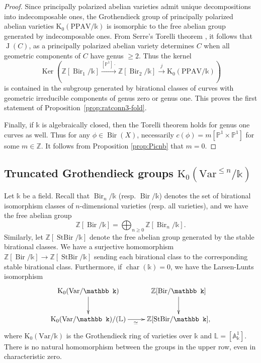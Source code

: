 \documentclass[a4paper,12pt]{amsart}
\def\A{\mathbb A}
\def\k{\mathbb k}
\def\L{\mathbb L}
\def\P{\mathbb P}
\def\Z{\mathbb Z}
\def\chr{{\operatorname{char}}}
\def\Ker{{\operatorname{Ker}}}
\def\chr{{\operatorname{char}}}
\def\Bir{{\operatorname{Bir}}}
\def\StBir{{\operatorname{StBir}}}
\def\Jac{{\operatorname{J}}}
\def\Kt{{\mathrm{K}}}
\def\PPAV{{\mathrm{PPAV}}}
\def\Var{{\mathrm{Var}}}
\theoremstyle{plain}
\numberwithin{equation}{section}
\theoremstyle{definition}
\renewcommand{\(}{\left(}
\renewcommand{\)}{\right)}
\begin{document}
\begin{proof}
Since principally polarized abelian varieties
admit unique decompositions into indecomposable ones, 
the Grothendieck 
group of principally
polarized abelian varieties
$\Kt_0(\PPAV/\k)$ is isomorphic to the free abelian group
generated by 
indecomposable ones. 
From Serre's Torelli theorem \cite[Appendix]{SerreTorelli},
it follows that $\Jac(C)$, as a principally polarized
abelian variety determines $C$ when all geometric components
of $C$ have genus $\ge 2$.
Thus the kernel
\[
\Ker(\Z[\Bir_1/\k] \overset{[\P^1] \cdot}{\to} \Z[\Bir_2/\k] 
\overset{j}\to \Kt_0(\PPAV/\k))
\]
is contained in the subgroup generated by 
birational classes of
curves with
geometric irreducible components
of genus zero or genus one.
This 
proves the first statement of Proposition~\ref{prop:ratconn3-fold}.

Finally, if $\k$ is algebraically closed,
then the Torelli theorem holds
for genus one curves as well. Thus for any
$\phi \in \Bir(X)$, 
necessarily 
$c(\phi) = m[\P^1 \times \P^1]$ for some $m \in \Z$.
It follows from Proposition \ref{prop:Picnb}
that $m = 0$.
\end{proof}

\subsection{Truncated Grothendieck groups $\Kt_0(\Var^{\le n}/\k)$}\label{ssec-tG0} 
\hfill

Let $\k$ be a field.
Recall that $\Bir_{n}/\k$ (resp. $\Bir/\k$)
denotes the set of birational isomorphism
classes of $n$-dimensional varieties (resp. all varieties),
and we have
the free abelian group 
$$\Z[\Bir/\k] = \bigoplus_{n \ge 0} \Z[\Bir_n/\k].$$
Similarly, let $\Z[\StBir/\k]$ denote 
the 
free abelian group
generated by the stable birational classes.
We have a surjective
homomorphism $\Z[\Bir/\k] \to 
\Z[\StBir/\k]$
sending each birational class to the corresponding
stable birational class.
Furthermore, if
$\chr(\k) = 0$, we have the Larsen-Lunts
isomorphism \cite{LarsenLunts} 
\[\xymatrix{
\Kt_0(\Var/\k) \ar[d] & \Z[\Bir/\k] \ar[d] \\
\Kt_0(\Var/\k) / (\L) \ar[r]_{ \ \ \simeq} &  \Z[\StBir/\k],
}
\]
where $\Kt_0(\Var/\k)$ is the Grothendieck ring of varieties over $\k$ and $\L = [\A^1_\k]$.
There is no natural homomorphism
between
the groups in the upper
row, even in characteristic zero.
\end{document}
